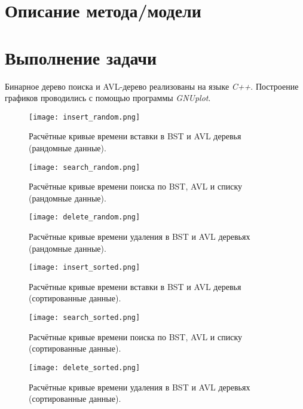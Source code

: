 \documentclass[12pt, a4paper]{report}
\begin{document}
	\section*{Описание метода/модели}
	\large

	\newpage

	\section*{Выполнение задачи}
	Бинарное дерево поиска и AVL-дерево реализованы на языке \textit{C++}. Построение графиков проводились с помощью программы \textit{GNUplot}.

	\newpage
	\vfill

	\begin{figure}[h]
		\centering
		\texttt{[image: insert\_random.png]}
		\caption{Расчётные кривые времени вставки в BST и AVL деревья (рандомные данные).}
	\end{figure}
	\begin{figure}[h]
		\centering
		\texttt{[image: search\_random.png]}
		\caption{Расчётные кривые времени поиска по BST, AVL и списку (рандомные данные).}
	\end{figure}
	\begin{figure}[h]
		\centering
		\texttt{[image: delete\_random.png]}
		\caption{Расчётные кривые времени удаления в BST и AVL деревьях (рандомные данные).}
	\end{figure}
	\begin{figure}[h]
		\centering
		\texttt{[image: insert\_sorted.png]}
		\caption{Расчётные кривые времени вставки в BST и AVL деревья (сортированные данные).}
	\end{figure}
	\begin{figure}[h]
		\centering
		\texttt{[image: search\_sorted.png]}
		\caption{Расчётные кривые времени поиска по BST, AVL и списку (сортированные данные).}
	\end{figure}
	\begin{figure}[h]
		\centering
		\texttt{[image: delete\_sorted.png]}
		\caption{Расчётные кривые времени удаления в BST и AVL деревьях (сортированные данные).}
	\end{figure}
\end{document}
